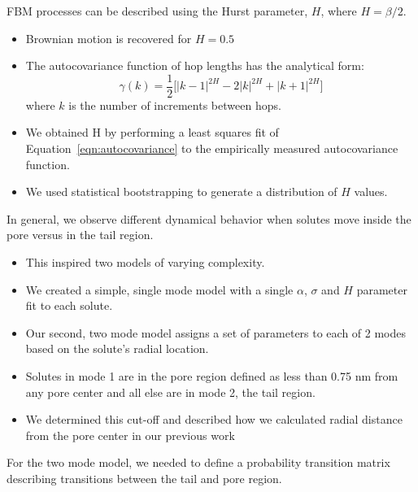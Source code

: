 \documentclass{article}
\begin{document}
  \noindent FBM processes can be described using the Hurst parameter, $H$, where 
  $H = \beta/2$.
  \begin{itemize}
  	\item Brownian motion is recovered for $H = 0.5$
	\item The autocovariance function of hop lengths has the analytical form:~\cite{mandelbrot_fractional_1968}
    \begin{equation}
	\gamma(k) = \dfrac{1}{2}\bigg[|k-1|^{2H} - 2|k|^{2H} + |k+1|^{2H}\bigg]
	\label{eqn:autocovariance}
	\end{equation}
	where $k$ is the number of increments between hops.
	\item We obtained H by performing a least squares fit of Equation~\ref{eqn:autocovariance}
	to the empirically measured autocovariance function.
	\item We used statistical bootstrapping to generate a distribution of $H$ 
	values. %
  \end{itemize}
  
  In general, we observe different dynamical behavior when solutes move inside the
  pore versus in the tail region.
  \begin{itemize}
    \item This inspired two models of varying complexity.
    \item We created a simple, single mode model with a single $\alpha$, $\sigma$ and $H$
    parameter fit to each solute.
    \item Our second, two mode model assigns a set of parameters to each of 2 modes based
    on the solute's radial location.
    \item Solutes in mode 1 are in the pore region defined as less than 0.75 nm from any
    pore center and all else are in mode 2, the tail region. 
    \item We determined this cut-off and described how we calculated radial 
    distance from the pore center in our previous work~\cite{coscia_chemically_2019}
  \end{itemize}
  
  For the two mode model, we needed to define a probability transition matrix 
  describing transitions between the tail and pore region. 

\end{document}
